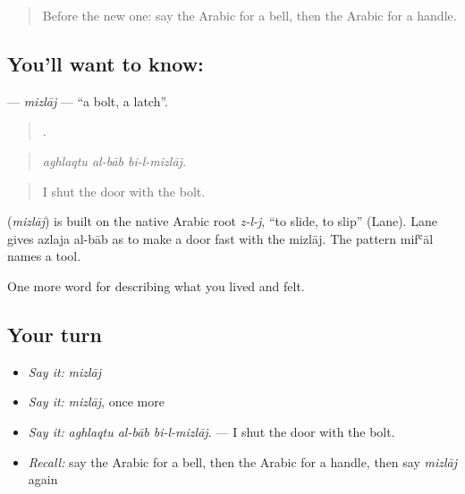 \label{lesson:AR-C549-mizlaj}



\begin{quote}
Before the new one: say the Arabic for a bell, then the Arabic for a handle.
\end{quote}

\subsection*{You'll want to know: }
\textbf{} — \emph{mizlāj} — \textquotedblleft{}a bolt, a latch\textquotedblright{}.

\begin{quote}
  .
\end{quote}

\begin{quote}
\emph{aghlaqtu al-bāb bi-l-mizlāj.}
\end{quote}

\begin{quote}
I shut the door with the bolt.
\end{quote}

\begin{cousinweb}
\textbf{} (\emph{mizlāj}) is built on the native Arabic root \emph{z-l-j}, \textquotedblleft{}to slide, to slip\textquotedblright{} (Lane). Lane gives azlaja al-bāb as to make a door fast with the mizlāj. The pattern mifʿāl names a tool.
\end{cousinweb}

\begin{grammarlens}[title={What you've built}]
One more word for describing what you lived and felt.
\end{grammarlens}

\subsection*{Your turn}
\begin{itemize}
\raggedright
  \item \emph{Say it:} \emph{mizlāj}
  \item \emph{Say it:} \emph{mizlāj}, once more
  \item \emph{Say it:} \emph{aghlaqtu al-bāb bi-l-mizlāj.} — I shut the door with the bolt.
  \item \emph{Recall:} say the Arabic for a bell, then the Arabic for a handle, then say \emph{mizlāj} again
\end{itemize}

